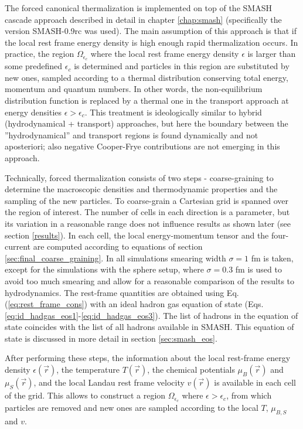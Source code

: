The forced canonical thermalization is implemented on top of the SMASH cascade
approach described in detail in chapter \ref{chap:smash} (specifically the version
SMASH-0.9rc was used). The main assumption of this approach is that if the local rest
frame energy density is high enough rapid thermalization occurs. In practice, the
region $\Omega_{\epsilon_c}$ where the local rest frame energy density $\epsilon$ is
larger than some predefined $\epsilon_c$ is determined and  particles in this region
are substituted by new ones, sampled according to a thermal distribution conserving
total energy, momentum and quantum numbers. In other words, the non-equilibrium
distribution function is replaced by a thermal one in the transport approach at
energy densities $\epsilon > \epsilon_c$. This treatment is ideologically
similar to hybrid (hydrodynamical + transport) approaches, but here the
boundary between the ''hydrodynamical'' and transport regions is found
dynamically and not aposteriori; also negative Cooper-Frye contributions are
not emerging in this approach.

Technically, forced thermalization consists of two steps - coarse-graining to
determine the macroscopic densities and thermodynamic properties and the
sampling of the new particles. To coarse-grain a Cartesian grid is spanned over
the region of interest. The number of cells in each direction is a parameter,
but its variation in a reasonable range does not influence results as shown
later (see section \ref{results}). In each cell, the local energy-momentum
tensor and the four-current are computed according to equations of section
\ref{sec:final_coarse_graining}. In all simulations smearing width $\sigma = 1$ fm is
taken, except for the simulations with the sphere setup, where $\sigma = 0.3$
fm is used to avoid too much smearing and allow for a reasonable comparison of
the results to hydrodynamics. The rest-frame quantities are obtained using Eq.
(\ref{eq:rest_frame_cons}) with an ideal hadron gas equation of state (Eqs.
\ref{eq:id_hadgas_eos1}-\ref{eq:id_hadgas_eos3}).  The list of hadrons in the
equation of state coincides with the list of all hadrons available in SMASH.  This equation of
state is discussed in more detail in section \ref{sec:smash_eos}.

After performing these steps, the information about the local rest-frame energy
density $\epsilon(\vec{r})$, the temperature $T(\vec{r})$, the chemical
potentials $\mu_B(\vec{r})$ and $\mu_S(\vec{r})$, and the local Landau rest
frame velocity $v(\vec{r})$ is available in each cell of the grid. This allows
to construct a region $\Omega_{\epsilon_c}$ where $\epsilon > \epsilon_c$, from
which particles are removed and new ones are sampled according to the local $T$,
$\mu_{B,S}$ and $v$.

